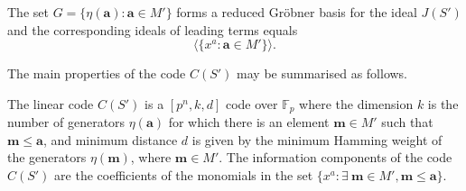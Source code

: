 \documentclass[english,bachelor]{liumaiex}
\begin{document}
\begin{cor}
\label{cor:redgrob}
The set $G=\{\eta(\mathbf{a})\colon \mathbf{a}\in M'\}$ forms a reduced Gröbner basis for the ideal $J(S')$ and the corresponding ideals of leading terms equals $$\langle\{x^a\colon\mathbf{a}\in M'\}\rangle.$$
\end{cor}
The main properties of the code $C(S')$ may be summarised as follows.

\begin{thm}
The linear code $C(S')$ is a $[p^n,k,d]$ code over $\mathbb{F}_p$ where the dimension $k$ is the number of generators $\eta(\mathbf{a})$ for which there is an element $\mathbf{m}\in M'$ such that $\mathbf{m}\leq\mathbf{a}$, and minimum distance $d$ is given by the minimum Hamming weight of the generators $\eta(\mathbf{m})$, where $\mathbf{m}\in M'$. The information components of the code $C(S')$ are the coefficients of the monomials in the set $\{x^a\colon \exists \ \mathbf{m}\in M', \mathbf{m}\leq\mathbf{a}\}$.
\end{thm}
\end{document}
